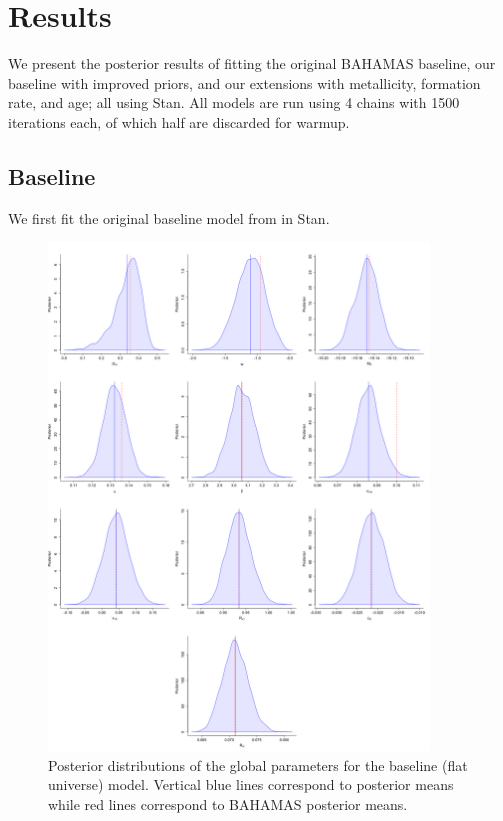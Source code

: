\section{Results}
\label{sec:ode_results}

We present the posterior results of fitting the original BAHAMAS baseline, our baseline with improved priors, and our extensions with metallicity, formation rate, and age; all using Stan. All models are run using 4 chains with 1500 iterations each, of which half are discarded for warmup. 

\subsection{Baseline}
\label{sec:ode_results_baseline}

We first fit the original baseline model from \citet{Shariff+others:2016} in Stan. 

\begin{figure}
\centering
	\includegraphics[width=0.9\textwidth]{figures/ode/base_flat_BAH_all.png}
\caption{Posterior distributions of the global parameters for the baseline (flat universe) model. Vertical blue lines correspond to posterior means while red lines correspond to BAHAMAS posterior means.}
\label{fig:ode_base_flat_BAH}
\end{figure}

